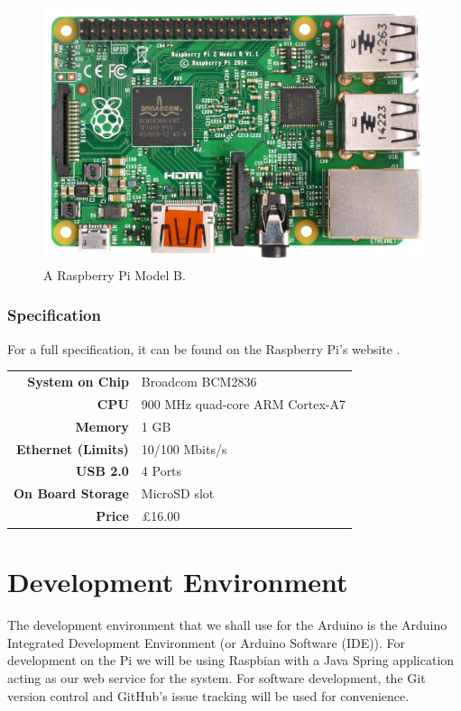\documentclass[11pt, a4paper]{article}
\begin{document}
\begin{figure}[H]
    \centering
    \includegraphics[scale = 0.05]{images/pi}
    \caption{A Raspberry Pi Model B.\cite{PiImage}}
    \label{fig:pi}
\end{figure}

\subsubsection{Specification}
For a full specification, it can be found on the Raspberry Pi's website
\cite{PiSpecs}.

\begin{tabular}{>{\bfseries}r l}
	System on Chip & Broadcom BCM2836 \\
	CPU & 900 MHz quad-core ARM Cortex-A7 \\
	Memory & 1 GB \\
	Ethernet (Limits) & 10/100 Mbits/s \\
	USB 2.0 & 4 Ports \\
	On Board Storage & MicroSD slot \\
	Price & £16.00 \\
\end{tabular}

\newpage


\section{Development Environment}
The development environment that we shall use for the Arduino is the Arduino
Integrated Development Environment (or Arduino Software (IDE)). For development
on the Pi we will be using Raspbian with a Java Spring application acting as our
web service for the system. For software development, the Git version control
and GitHub's issue tracking will be used for convenience.
\end{document}
